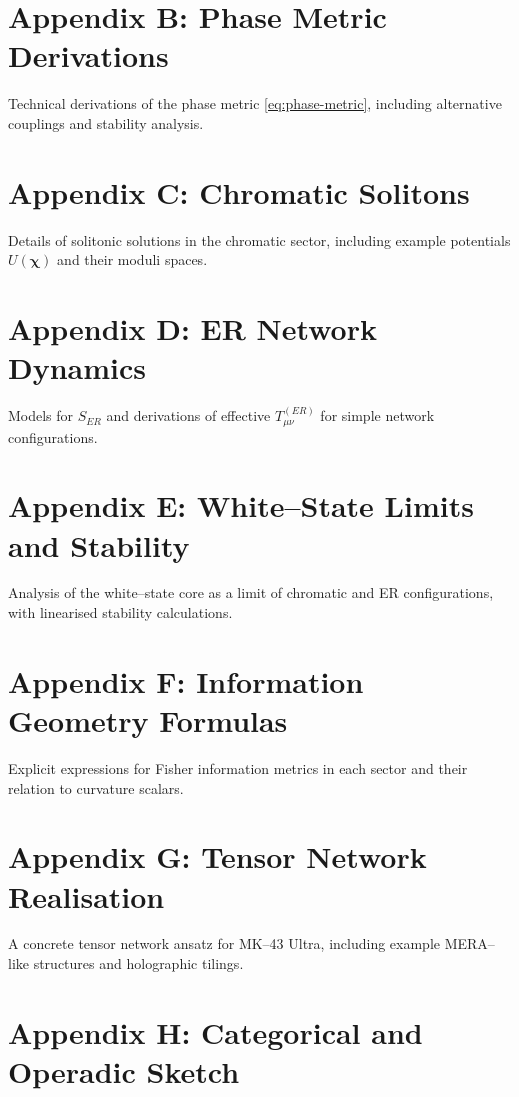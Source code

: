 \documentclass[11pt]{book}
\begin{document}
\chapter{Appendix B: Phase Metric Derivations}

Technical derivations of the phase metric \eqref{eq:phase-metric}, including alternative couplings and stability analysis.

\chapter{Appendix C: Chromatic Solitons}

Details of solitonic solutions in the chromatic sector, including example potentials $U(\bm{\chi})$ and their moduli spaces.

\chapter{Appendix D: ER Network Dynamics}

Models for $S_{ER}$ and derivations of effective $T^{(ER)}_{\mu\nu}$ for simple network configurations.

\chapter{Appendix E: White--State Limits and Stability}

Analysis of the white--state core as a limit of chromatic and ER configurations, with linearised stability calculations.

\chapter{Appendix F: Information Geometry Formulas}

Explicit expressions for Fisher information metrics in each sector and their relation to curvature scalars.

\chapter{Appendix G: Tensor Network Realisation}

A concrete tensor network ansatz for MK--43 Ultra, including example MERA--like structures and holographic tilings.

\chapter{Appendix H: Categorical and Operadic Sketch}
\end{document}
